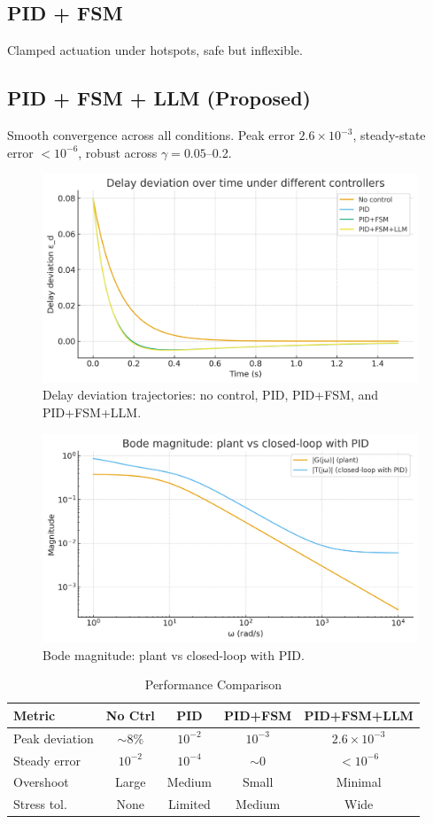 \documentclass[conference]{IEEEtran}
\begin{document}
\subsection{PID + FSM}
Clamped actuation under hotspots, safe but inflexible.  
\subsection{PID + FSM + LLM (Proposed)}
Smooth convergence across all conditions. Peak error $2.6 \times 10^{-3}$, steady-state error $<10^{-6}$, robust across $\gamma=0.05$--0.2.  
\begin{figure}[h]
\centering
\includegraphics[width=0.9\columnwidth]{fig2_time_response.png}
\caption{Delay deviation trajectories: no control, PID, PID+FSM, and PID+FSM+LLM.}
\label{fig:time}
\end{figure}
\begin{figure}[h]
\centering
\includegraphics[width=0.9\columnwidth]{fig3_bode_magnitude.png}
\caption{Bode magnitude: plant vs closed-loop with PID.}
\label{fig:bode}
\end{figure}
\begin{table}[h]
\renewcommand{\arraystretch}{1.1}
\caption{Performance Comparison}
\centering
\begin{tabular}{|l|c|c|c|c|}
\hline
Metric & No Ctrl & PID & PID+FSM & PID+FSM+LLM \\
\hline
Peak deviation & $\sim$8\% & $10^{-2}$ & $10^{-3}$ & $2.6\times 10^{-3}$ \\
Steady error   & $10^{-2}$ & $10^{-4}$ & $\sim$0 & $<10^{-6}$ \\
Overshoot      & Large     & Medium    & Small   & Minimal \\
Stress tol.    & None      & Limited   & Medium  & Wide \\
\hline
\end{tabular}
\end{table}
\end{document}
